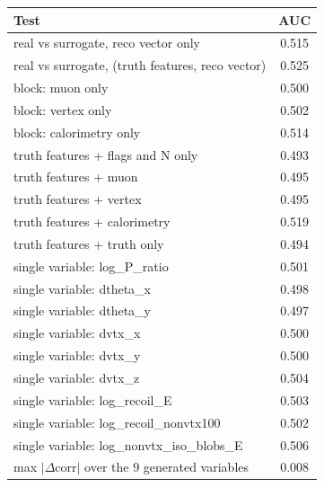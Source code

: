 \begin{tabular}{lc}
\toprule
Test & AUC \\
\midrule
real vs surrogate, reco vector only & 0.515 \\
real vs surrogate, (truth features, reco vector) & 0.525 \\
\midrule
block: muon only & 0.500 \\
block: vertex only & 0.502 \\
block: calorimetry only & 0.514 \\
truth features + flags and N only & 0.493 \\
truth features + muon & 0.495 \\
truth features + vertex & 0.495 \\
truth features + calorimetry & 0.519 \\
truth features + truth only & 0.494 \\
single variable: log\_P\_ratio & 0.501 \\
single variable: dtheta\_x & 0.498 \\
single variable: dtheta\_y & 0.497 \\
single variable: dvtx\_x & 0.500 \\
single variable: dvtx\_y & 0.500 \\
single variable: dvtx\_z & 0.504 \\
single variable: log\_recoil\_E & 0.503 \\
single variable: log\_recoil\_nonvtx100 & 0.502 \\
single variable: log\_nonvtx\_iso\_blobs\_E & 0.506 \\
\midrule
max $|\Delta$corr$|$ over the 9 generated variables & 0.008 \\
\bottomrule
\end{tabular}
